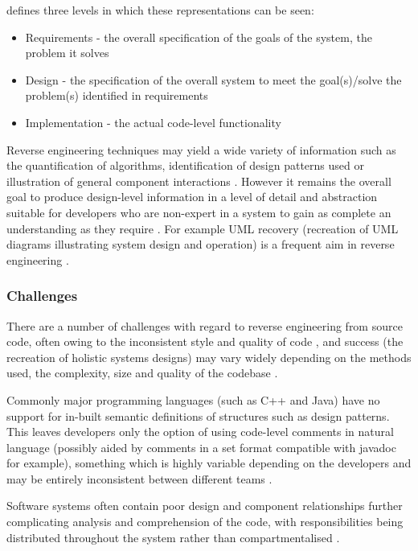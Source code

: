 \cite{chikofsky1990reverse} defines three levels in which these representations can be seen:
\begin{itemize}
\item Requirements - the overall specification of the goals of the system, the problem it solves
\item Design - the specification of the overall system to meet the goal(s)/solve the problem(s) identified in requirements
\item Implementation - the actual code-level functionality
\end{itemize}

Reverse engineering techniques may yield a wide variety of information such as the quantification of algorithms, identification of design patterns used or illustration of general component interactions \citep{roscoelooking}. However it remains the overall goal to produce design-level information in a level of detail and abstraction suitable for developers who are non-expert in a system to gain as complete an understanding as they require \citep{chikofsky1990reverse,philippow2005approach}. For example UML recovery (recreation of UML diagrams illustrating system design and operation) is a frequent aim in reverse engineering \citep{roscoelooking}.

\subsubsection{Challenges}\label{lit-reverseengineering-challenges}

There are a number of challenges with regard to reverse engineering from source code, often owing to the inconsistent style and quality of code \citep{counsell2004design,uchiyama2011design,meyer2006pattern}, and success (the recreation of holistic systems designs) may vary widely depending on the methods used, the complexity, size and quality of the codebase \citep{counsell2004design}.

Commonly major programming languages (such as C++ and Java) have no support for in-built semantic definitions of structures such as design patterns. This leaves developers only the option of using code-level comments in natural language (possibly aided by comments in a set format compatible with javadoc for example), something which is highly variable depending on the developers and may be entirely inconsistent between different teams \citep{philippow2005approach}.

Software systems often contain poor design and component relationships further complicating analysis and comprehension of the code, with responsibilities being distributed throughout the system rather than compartmentalised \citep{meyer2006pattern}.

